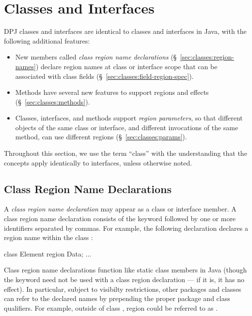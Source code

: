 \section{Classes and Interfaces%
\label{sec:classes}}

DPJ classes and interfaces are identical to classes and interfaces in
Java, with the following additional features:
%
\begin{itemize}
%
\item New members called \emph{class region name declarations}
  (\S~\ref{sec:classes:region-names}) declare region names at class or
  interface scope that can be associated with class fields
  (\S~\ref{sec:classes:field-region-spec}).
%
\item Methods have several new features to support regions and effects
  (\S~\ref{sec:classes:methods}).
%
\item Classes, interfaces, and methods support \emph{region
  parameters}, so that different objects of the same class or
  interface, and different invocations of the same method, can use
  different regions (\S~\ref{sec:classes:params}).
%
\end{itemize}
%
Throughout this section, we use the term ``class'' with the
understanding that the concepts apply identically to interfaces,
unless otherwise noted.

\subsection{Class Region Name Declarations%
\label{sec:classes:region-names}}

A \emph{class region name declaration} may appear as a class or
interface member.  A class region name declaration consists of the
keyword  followed by one or more identifiers separated by
commas. For example, the following declaration declares a region name
 within the class :

\begin{dpjlisting}
class Element {
	region Data;
	...
}
\end{dpjlisting}

Class region name declarations function like static class members in
Java (though the keyword  need not be used with a class
region declaration --- if it is, it has no effect).  In particular,
subject to visibilty restrictions, other packages and classes can
refer to the declared names by prepending the proper package and class
qualifiers.  For example, outside of class , region
 could be referred to as .

